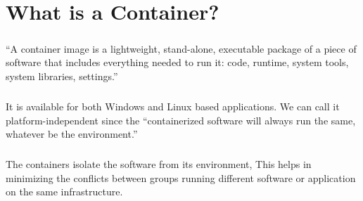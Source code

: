 \chapter{What is a Container?}

\paragraph{\hspace{24pt}}
“A container image is a lightweight, stand-alone, executable package of a piece of software that includes everything needed to run it: code, runtime, system tools, system libraries, settings.”

\paragraph{\hspace{24pt}}
It is available for both Windows and Linux based applications. We can call it platform-independent since the “containerized software will always run the same, whatever be the environment.”

\paragraph{\hspace{24pt}}
The containers isolate the software from its environment, This helps in minimizing the conflicts between groups running different software or application on the same infrastructure.